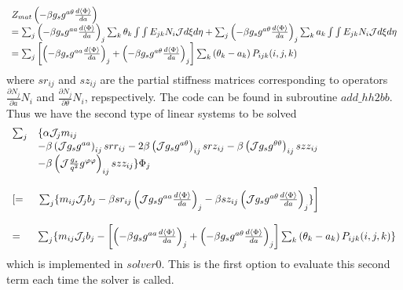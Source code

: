 \documentclass{report}
\newcommand{\ff}[2]{\frac{#1}{#2}}
\newcommand{\pp}[2]{\frac{\partial{#1}}{\partial{#2}}}
\begin{document}
$$\begin{array}{l}
   Z_{mat} \left( -\beta g_s g^{a\theta} \ff{d\langle \Phi \rangle}{da} \right)
\\
=\sum_j \left( -\beta g_s g^{aa} \ff{d\langle \Phi \rangle}{da} \right)_j
         \sum_k \theta_k \int\int E_{jk} N_i {\cal J} d\xi d\eta 
+
 \sum_j \left( -\beta g_s g^{a\theta} \ff{d\langle \Phi \rangle}{da} \right)_j
         \sum_k a_k \int\int E_{jk} N_i {\cal J} d\xi d\eta 
\\
=\sum_j \left[ \left( -\beta g_s g^{aa} \ff{d\langle \Phi \rangle}{da} \right)_j
               +
               \left( -\beta g_s g^{a\theta} \ff{d\langle \Phi \rangle}{da} \right)_j
        \right]
         \sum_k \left( \theta_k - a_k\right) P_{ijk}(i,j,k)
\end{array}
$$
where $sr_{ij}$ and $sz_{ij}$ are the partial stiffness matrices corresponding to
operators $\pp{N_j}{a} N_i$ and $\pp{N_j}{\theta} N_i$, repspectively.
The code can be found in subroutine $add\_hh2bb$.
Thus we have the second type of linear systems to be solved
\begin{equation}
\begin{array}{ll}
\sum_j & \{ \alpha {\cal J}_j m_{ij} \\
       & - \beta \left( {\cal J} g_s g^{a a} \right)_{ij} srr_{ij} 
         -2\beta \left( {\cal J} g_s g^{a \theta} \right)_{ij} srz_{ij}
         - \beta \left( {\cal J} g_s g^{\theta \theta} \right)_{ij} szz_{ij}
\\
       & - \beta \left( {\cal J}\ff{g_s}{q^2} g^{\varphi \varphi} \right)_{ij} szz_{ij}
       \} \Phi_j 
\\
\\
\left[ =\right. & \left. \sum_j \{ m_{ij} {\cal J}_j b_j
              - \beta sr_{ij} \left( {\cal J} g_s g^{aa} \ff{d\langle \Phi \rangle}{da} \right)_j
              - \beta sz_{ij} \left( {\cal J} g_s g^{a\theta} \ff{d\langle \Phi \rangle}{da} \right)_j
           \} \right]
\\
\\
= & \sum_j \{ m_{ij} {\cal J}_j b_j
 - \left[ \left( -\beta g_s g^{aa} \ff{d\langle \Phi \rangle}{da} \right)_j
               +
               \left( -\beta g_s g^{a\theta} \ff{d\langle \Phi \rangle}{da} \right)_j
        \right]
         \sum_k \left( \theta_k - a_k\right) P_{ijk}(i,j,k) \}
\end{array}
\end{equation}
which is implemented in $solver0$.
This is the first option to evaluate this second term
each time the solver is called. 
\end{document}
